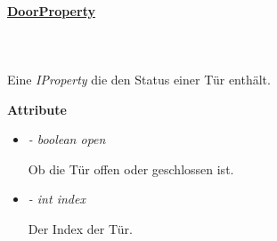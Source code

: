         \paragraph{\underline{DoorProperty}} \mbox{}\\
        \\
            Eine \textit{IProperty} die den Status einer Tür enthält.\par

            \textbf{Attribute}
            \begin{itemize}
                \item \textit{- boolean open}
                    \begin{leftbar}[0.9\linewidth]
                        Ob die Tür offen oder geschlossen ist.
                    \end{leftbar}
                \item \textit{- int index}
                    \begin{leftbar}[0.9\linewidth]
                        Der Index der Tür.
                    \end{leftbar}
            \end{itemize}

